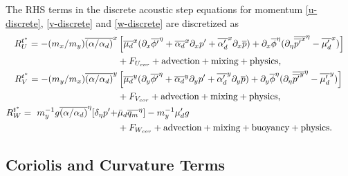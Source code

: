 The RHS terms in the discrete acoustic step equations 
for momentum
\eqref{u-discrete}, \eqref{v-discrete} and \eqref{w-discrete}
are discretized as
%
\begin{align}
R_U^{t^*} =
 -(m_x/m_y) \overline{(\alpha/\alpha_d)}^x & \left[ \overline{\mu_d}^x (\partial_x \overline{\phi'}^\eta
+ \overline{\alpha_d}^x \partial_x p' + \overline{\alpha'_d}^x \partial_x \overline{p}) +
\partial_x \overline{\phi}^\eta (\partial_\eta \overline{\overline{p'}^x}^\eta - \overline{\mu'_d}^x)\right] & \cr
& + F_{U_{cor}} + \hbox{advection} + \hbox{mixing} + \hbox{physics,}
\label{u-pg-discrete} \\
%
R_V^{t^*} =
 -(m_y/m_x) \overline{(\alpha/\alpha_d)}^y & \left[ \overline{\mu_d}^y (\partial_y \overline{\phi'}^\eta
+ \overline{\alpha_d}^y \partial_y p' + \overline{\alpha'_d}^y \partial_y \overline{p}) +
\partial_y \overline{\phi}^\eta (\partial_\eta \overline{\overline{p'}^y}^\eta - \overline{\mu'_d}^y)\right] & \cr
& + F_{V_{cor}} + \hbox{advection} + \hbox{mixing} + \hbox{physics,}
\label{v-pg-discrete} \\
%
R_W^{t^*} = ~ m_y^{-1} g \overline{(\alpha/\alpha_d)}^\eta [\delta_\eta p' 
+ & {\bar{\mu}}_d \overline{q_m}^\eta]
- m_y^{-1} {\mu}_d'g & \cr
& + F_{W_{cor}} + \hbox{advection} + \hbox{mixing} + \hbox{buoyancy} + \hbox{physics}.
\label{w-pg-discrete}
\end{align}

\subsection{Coriolis and Curvature Terms}

